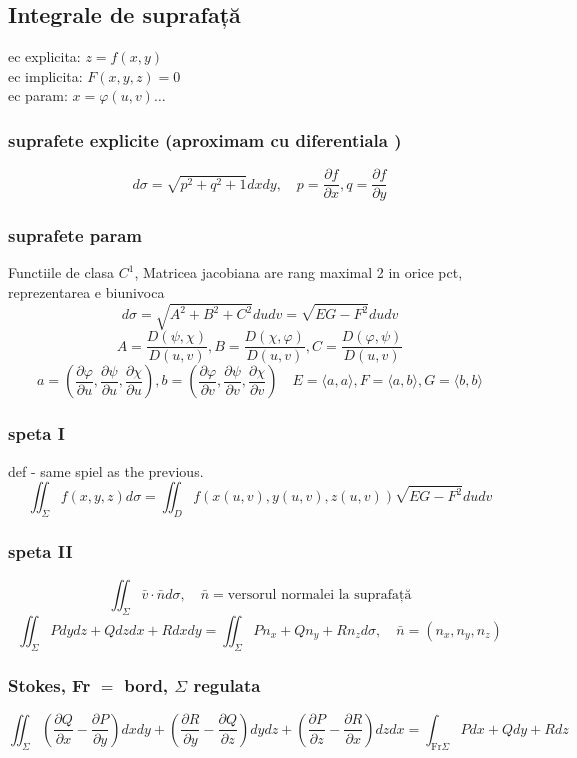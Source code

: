 \documentclass{article}
\newcommand{\parti}[2]{\frac{\partial #1}{ \partial #2}}
\begin{document}
\subsection*{Integrale de suprafață}
ec explicita: $z= f(x, y)$\\
ec implicita: $F(x,y,z)=0$\\
ec param: $x = \varphi(u,v)\ldots$\\
\subsubsection*{suprafete explicite (aproximam cu diferentiala )}
\[d\sigma = \sqrt{p^2+q^2+1}dx dy, \quad p = \parti f x, q = \parti f y\]
\subsubsection*{suprafete param}
Functiile de clasa $C^1$, Matricea jacobiana are rang maximal 2 in orice pct, reprezentarea e biunivoca\\
\[d\sigma = \sqrt{A^2+B^2+C^2}du dv = \sqrt{EG-F^2}du dv\]
\[A = \frac{D(\psi, \chi)}{D(u, v)}, B = \frac{D(\chi, \varphi)}{D(u, v)}, C = \frac{D(\varphi, \psi)}{D(u, v)} \]
\[ a = \left( \parti{\varphi}{u}, \parti{\psi}{u}, \parti{\chi}{u} \right),
  b = \left( \parti{\varphi}{v}, \parti{\psi}{v}, \parti{\chi}{v} \right)\quad
  E = \langle a, a \rangle,
  F =\langle a, b \rangle,
  G =\langle b, b \rangle
\]
\subsubsection*{speta I}
def - same spiel as the previous.
\[\iint_{\Sigma} f(x, y,z) d\sigma = \iint_{D} f(x(u, v), y(u,v), z(u,v)) \sqrt{EG-F^2}du dv\]
\subsubsection*{speta II}
\[ \iint_{\Sigma}\bar{v}\cdot\bar{n} d\sigma, \quad \bar{n} = \text{versorul normalei la suprafață} \]
\[ \iint_{\Sigma} Pdy dz + Q dz dx + R dx dy = \iint_{\Sigma} Pn_x+Qn_y+Rn_z d\sigma, \quad \bar{n} = (n_x, n_y, n_z) \]
\subsubsection*{Stokes, Fr $= $ bord, $\Sigma$ regulata}
\[ \iint_\Sigma \left( \parti Q x - \parti P y \right) dx dy
 + \left( \parti R y - \parti Q z \right)  dy dz
 +\left( \parti P z - \parti R x \right) dz dx = \int_{\mathrm{Fr}\Sigma} Pdx+Qdy+Rdz \]
\end{document}

